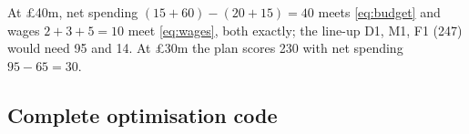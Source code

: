At \pounds 40m, net spending $(15 + 60) - (20 + 15) = 40$ meets \eqref{eq:budget} and wages $2 + 3 + 5 = 10$ meet \eqref{eq:wages}, both exactly; the line-up D1, M1, F1 (247) would need 95 and 14. At \pounds 30m the plan scores 230 with net spending $95 - 65 = 30$.

\subsection{Complete optimisation code}

\begin{singlespace}

\end{singlespace}

\FloatBarrier
